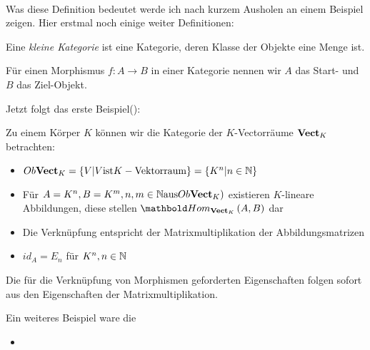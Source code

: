 \documentclass{article}
\begin{document}
		\\
		Was  diese Definition bedeutet werde ich nach kurzem Ausholen an einem Beispiel zeigen.
		Hier erstmal noch einige weiter Definitionen:
		
		Eine \emph{kleine Kategorie} ist eine Kategorie, deren Klasse der Objekte eine Menge ist.

		F\"ur einen Morphismus \( f: A \to B \) in einer Kategorie \CatC nennen wir \( A \) das Start- und \( B \) das Ziel-Objekt.
		
		\label{test}
		Jetzt folgt das erste Beispiel(\cite[Beispiel 2.2.10]{Bra}):
		
		Zu einem K\"orper \( K \) k\"onnen wir die Kategorie der \( K\)-Vectorr\"aume \( \mathbf{Vect}_K \) betrachten:
		\begin{itemize}
			\item	\( Ob \mathbf{Vect}_K = \left\lbrace V | V \text{ist} K-\text{Vektorraum} \right\rbrace  = \left\lbrace K^n | n \in \mathbb{N} \right\rbrace \)
			\item F\"ur  \( A=K^n , B =K^m , n,m \in \mathbb{N} \text{aus} Ob\mathbf{Vect}_K) \) existieren $K$-lineare Abbildungen, diese stellen \( \Hom_{\CatVect_K}\left( A,B \right) \) dar
			\item Die Verkn\"upfung entspricht der Matrixmultiplikation der Abbildungsmatrizen 
			\item \( id_A = E_n \) f\"ur \( K^n , n \in \mathbb{N} \)
		 \end{itemize}
		 Die f\"ur die Verkn\"upfung von Morphismen geforderten Eigenschaften folgen sofort aus den Eigenschaften der Matrixmultiplikation.
		 
		 
		 Ein weiteres Beispiel ware die 
		 
		 \begin{itemize}
			 \item \Ob 
		 \end{itemize}
		 

 
\end{document}
